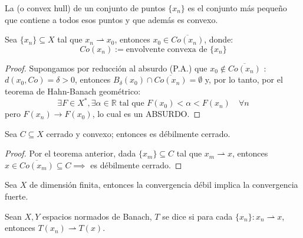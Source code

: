 \begin{observacion}
    La  (o convex hull) de un conjunto de puntos $\{x_n\}$ es el conjunto más pequeño que contiene a todos esos puntos y que además es convexo.
\end{observacion}

\begin{teo}[Mazur]
    Sea $\{x_n\} \subseteq X$ tal que $x_n \rightharpoonup x_0$, entonces $x_0 \in \overline{Co(x_n)}$, donde:
    \begin{equation*}
        Co(x_n) := \text{envolvente convexa de } \{x_n\}
    \end{equation*}
\begin{proof}
    Supongamos por reducción al absurdo (P.A.) que $x_0 \notin \overline{Co(x_n)}$ : $d(x_0, Co) = \delta > 0$, entonces $B_\delta(x_0) \cap \overline{Co(x_n)} = \emptyset$ y, por lo tanto, por el teorema de Hahn-Banach geométrico:
    \begin{equation*}
        \exists F \in X^*, \exists \alpha \in \mathbb{R} \text{ tal que } F(x_0) < \alpha < F(x_n) \quad \forall n
    \end{equation*}
    pero $F(x_n) \longrightarrow F(x_0)$, lo cual es un ABSURDO.
\end{proof}
\end{teo}

\begin{coro}
    Sea $C \subseteq X$ cerrado y convexo; entonces es débilmente cerrado.
\begin{proof}
    Por el teorema anterior, dada $\{x_m\} \subseteq C$ tal que $x_m \rightharpoonup x$, entonces $x \in \overline{Co(x_m)} \subseteq C \implies$ es débilmente cerrado. 
\end{proof}
\end{coro}

\begin{observacion}
    Sea $X$ de dimensión finita, entonces la convergencia débil implica la convergencia fuerte. 
\end{observacion}

\begin{definicion}
    Sean $X, Y$ espacios normados de Banach, $T$ se dice  si para cada $\{x_n\} : x_n \rightharpoonup x$, entonces $T(x_n) \rightharpoonup T(x)$.
\end{definicion}

